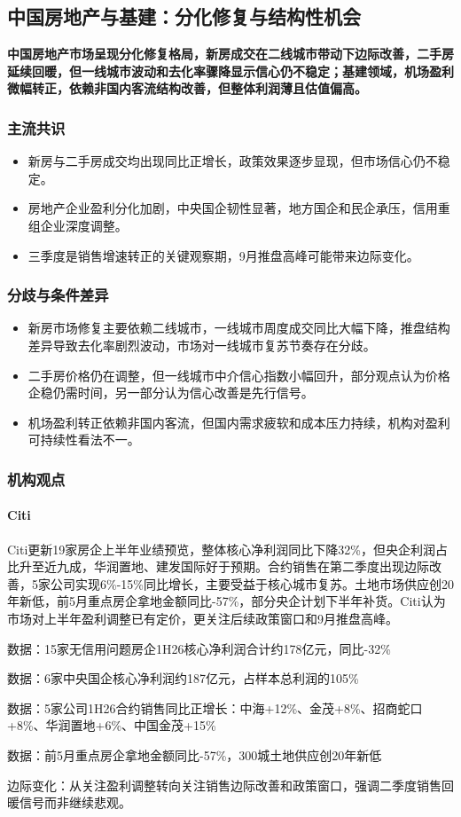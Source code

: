 \documentclass[11pt]{ctexart}
\begin{document}
\subsection{中国房地产与基建：分化修复与结构性机会}
\textbf{中国房地产市场呈现分化修复格局，新房成交在二线城市带动下边际改善，二手房延续回暖，但一线城市波动和去化率骤降显示信心仍不稳定；基建领域，机场盈利微幅转正，依赖非国内客流结构改善，但整体利润薄且估值偏高。}
\subsubsection*{主流共识}
\begin{itemize}
  \item 新房与二手房成交均出现同比正增长，政策效果逐步显现，但市场信心仍不稳定。
  \item 房地产企业盈利分化加剧，中央国企韧性显著，地方国企和民企承压，信用重组企业深度调整。
  \item 三季度是销售增速转正的关键观察期，9月推盘高峰可能带来边际变化。
\end{itemize}
\subsubsection*{分歧与条件差异}
\begin{itemize}
  \item 新房市场修复主要依赖二线城市，一线城市周度成交同比大幅下降，推盘结构差异导致去化率剧烈波动，市场对一线城市复苏节奏存在分歧。
  \item 二手房价格仍在调整，但一线城市中介信心指数小幅回升，部分观点认为价格企稳仍需时间，另一部分认为信心改善是先行信号。
  \item 机场盈利转正依赖非国内客流，但国内需求疲软和成本压力持续，机构对盈利可持续性看法不一。
\end{itemize}
\subsubsection*{机构观点}
\paragraph{Citi} Citi更新19家房企上半年业绩预览，整体核心净利润同比下降32\%，但央企利润占比升至近九成，华润置地、建发国际好于预期。合约销售在第二季度出现边际改善，5家公司实现6\%-15\%同比增长，主要受益于核心城市复苏。土地市场供应创20年新低，前5月重点房企拿地金额同比-57\%，部分央企计划下半年补货。Citi认为市场对上半年盈利调整已有定价，更关注后续政策窗口和9月推盘高峰。
{\small\color{refgray}数据：15家无信用问题房企1H26核心净利润合计约178亿元，同比-32\%\par}
{\small\color{refgray}数据：6家中央国企核心净利润约187亿元，占样本总利润的105\%\par}
{\small\color{refgray}数据：5家公司1H26合约销售同比正增长：中海+12\%、金茂+8\%、招商蛇口+8\%、华润置地+6\%、中国金茂+15\%\par}
{\small\color{refgray}数据：前5月重点房企拿地金额同比-57\%，300城土地供应创20年新低\par}
{\small\color{refgray}边际变化：从关注盈利调整转向关注销售边际改善和政策窗口，强调二季度销售回暖信号而非继续悲观。\par}
\end{document}
